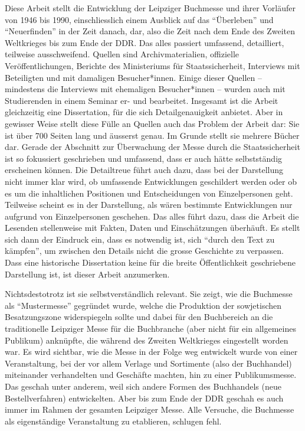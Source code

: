 \documentclass[a4paper,
fontsize=11pt,
oneside,
numbers=noperiodatend,
parskip=half-,
bibliography=totoc,
final
]{scrartcl}
\begin{document}
Diese Arbeit stellt die Entwicklung der Leipziger Buchmesse und ihrer
Vorläufer von 1946 bis 1990, einschliesslich einem Ausblick auf das
\enquote{Überleben} und \enquote{Neuerfinden} in der Zeit danach, dar, also die Zeit
nach dem Ende des Zweiten Weltkrieges bis zum Ende der DDR. Das alles
passiert umfassend, detailliert, teilweise ausschweifend. Quellen sind
Archivmaterialien, offizielle Veröffentlichungen, Berichte des
Ministeriums für Staatssicherheit, Interviews mit Beteiligten und mit
damaligen Besucher*innen. Einige dieser Quellen -- mindestens die
Interviews mit ehemaligen Besucher*innen -- wurden auch mit Studierenden
in einem Seminar er- und bearbeitet. Insgesamt ist die Arbeit
gleichzeitig eine Dissertation, für die sich Detailgenauigkeit anbietet.
Aber in gewisser Weise stellt diese Fülle an Quellen auch das Problem
der Arbeit dar: Sie ist über 700 Seiten lang und äusserst genau. Im
Grunde stellt sie mehrere Bücher dar. Gerade der Abschnitt zur
Überwachung der Messe durch die Staatssicherheit ist so fokussiert
geschrieben und umfassend, dass er auch hätte selbstständig erscheinen
können. Die Detailtreue führt auch dazu, dass bei der Darstellung nicht
immer klar wird, ob umfassende Entwicklungen geschildert werden oder ob
es um die inhaltlichen Positionen und Entscheidungen von Einzelpersonen
geht. Teilweise scheint es in der Darstellung, als wären bestimmte
Entwicklungen nur aufgrund von Einzelpersonen geschehen. Das alles führt
dazu, dass die Arbeit die Lesenden stellenweise mit Fakten, Daten und
Einschätzungen überhäuft. Es stellt sich dann der Eindruck ein, dass es
notwendig ist, sich \enquote{durch den Text zu kämpfen}, um zwischen den Details
nicht die grosse Geschichte zu verpassen. Dass eine historische
Dissertation keine für die breite Öffentlichkeit geschriebene
Darstellung ist, ist dieser Arbeit anzumerken.

Nichtsdestotrotz ist sie selbstverständlich relevant. Sie zeigt, wie die
Buchmesse als \enquote{Mustermesse} gegründet wurde, welche die Produktion der
sowjetischen Besatzungszone widerspiegeln sollte und dabei für den
Buchbereich an die traditionelle Leipziger Messe für die Buchbranche
(aber nicht für ein allgemeines Publikum) anknüpfte, die während des
Zweiten Weltkrieges eingestellt worden war. Es wird sichtbar, wie die
Messe in der Folge weg entwickelt wurde von einer Veranstaltung, bei der
vor allem Verlage und Sortimente (also der Buchhandel) miteinander
verhandelten und Geschäfte machten, hin zu einer Publikumsmesse. Das
geschah unter anderem, weil sich andere Formen des Buchhandels (neue
Bestellverfahren) entwickelten. Aber bis zum Ende der DDR geschah es
auch immer im Rahmen der gesamten Leipziger Messe. Alle Versuche, die
Buchmesse als eigenständige Veranstaltung zu etablieren, schlugen fehl.
\end{document}
